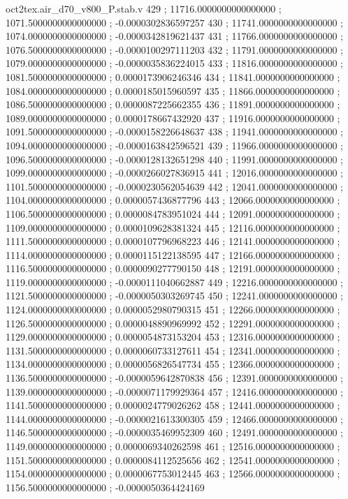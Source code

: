 \begin{filecontents}[overwrite]{oct2tex.air_d70_v800_P.stab.v}
429 ; 11716.0000000000000000 ; 1071.5000000000000000 ; -0.0000302836597257
430 ; 11741.0000000000000000 ; 1074.0000000000000000 ; -0.0000342819621437
431 ; 11766.0000000000000000 ; 1076.5000000000000000 ; -0.0000100297111203
432 ; 11791.0000000000000000 ; 1079.0000000000000000 ; -0.0000035836224015
433 ; 11816.0000000000000000 ; 1081.5000000000000000 ; 0.0000173906246346
434 ; 11841.0000000000000000 ; 1084.0000000000000000 ; 0.0000185015960597
435 ; 11866.0000000000000000 ; 1086.5000000000000000 ; 0.0000087225662355
436 ; 11891.0000000000000000 ; 1089.0000000000000000 ; 0.0000178667432920
437 ; 11916.0000000000000000 ; 1091.5000000000000000 ; -0.0000158226648637
438 ; 11941.0000000000000000 ; 1094.0000000000000000 ; -0.0000163842596521
439 ; 11966.0000000000000000 ; 1096.5000000000000000 ; -0.0000128132651298
440 ; 11991.0000000000000000 ; 1099.0000000000000000 ; -0.0000266027836915
441 ; 12016.0000000000000000 ; 1101.5000000000000000 ; -0.0000230562054639
442 ; 12041.0000000000000000 ; 1104.0000000000000000 ; 0.0000057436877796
443 ; 12066.0000000000000000 ; 1106.5000000000000000 ; 0.0000084783951024
444 ; 12091.0000000000000000 ; 1109.0000000000000000 ; 0.0000109628381324
445 ; 12116.0000000000000000 ; 1111.5000000000000000 ; 0.0000107796968223
446 ; 12141.0000000000000000 ; 1114.0000000000000000 ; 0.0000115122138595
447 ; 12166.0000000000000000 ; 1116.5000000000000000 ; 0.0000090277790150
448 ; 12191.0000000000000000 ; 1119.0000000000000000 ; -0.0000111040662887
449 ; 12216.0000000000000000 ; 1121.5000000000000000 ; -0.0000050303269745
450 ; 12241.0000000000000000 ; 1124.0000000000000000 ; 0.0000052980790315
451 ; 12266.0000000000000000 ; 1126.5000000000000000 ; 0.0000048890969992
452 ; 12291.0000000000000000 ; 1129.0000000000000000 ; 0.0000054873153204
453 ; 12316.0000000000000000 ; 1131.5000000000000000 ; 0.0000060733127611
454 ; 12341.0000000000000000 ; 1134.0000000000000000 ; 0.0000056826547734
455 ; 12366.0000000000000000 ; 1136.5000000000000000 ; -0.0000059642870838
456 ; 12391.0000000000000000 ; 1139.0000000000000000 ; -0.0000071179929364
457 ; 12416.0000000000000000 ; 1141.5000000000000000 ; 0.0000024779026262
458 ; 12441.0000000000000000 ; 1144.0000000000000000 ; -0.0000021613300305
459 ; 12466.0000000000000000 ; 1146.5000000000000000 ; -0.0000035469952309
460 ; 12491.0000000000000000 ; 1149.0000000000000000 ; 0.0000069340262598
461 ; 12516.0000000000000000 ; 1151.5000000000000000 ; 0.0000084112525656
462 ; 12541.0000000000000000 ; 1154.0000000000000000 ; 0.0000067753012445
463 ; 12566.0000000000000000 ; 1156.5000000000000000 ; -0.0000050364424169

\end{filecontents}
